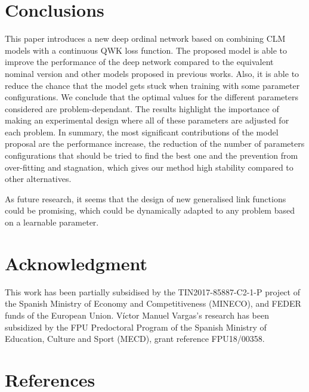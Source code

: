 \documentclass[preprint]{elsarticle}
\begin{document}
\section{Conclusions}
\label{sect:conclusions} 
This paper introduces a new deep ordinal network based on combining CLM models with a continuous QWK loss function. The proposed model is able to improve the performance of the deep network compared to the equivalent nominal version and other models proposed in previous works. Also, it is able to reduce the chance that the model gets stuck when training with some parameter configurations. We conclude that the optimal values for the different parameters considered are problem-dependant. The results highlight the importance of making an experimental design where all of these parameters are adjusted for each problem. In summary, the most significant contributions of the model proposal are the performance increase, the reduction of the number of parameters configurations that should be tried to find the best one and the prevention from over-fitting and stagnation, which gives our method high stability compared to other alternatives.

As future research, it seems that the design of new generalised link functions could be promising, which could be dynamically adapted to any problem based on a learnable parameter. 

\section*{Acknowledgment}
This work has been partially subsidised by the TIN2017-85887-C2-1-P project of the Spanish Ministry of Economy and Competitiveness (MINECO), and FEDER funds of the European Union. Víctor Manuel Vargas's research has been subsidized by the FPU Predoctoral Program of the Spanish Ministry of Education, Culture and Sport (MECD), grant reference FPU18/00358.


\section*{References}


\end{document}
